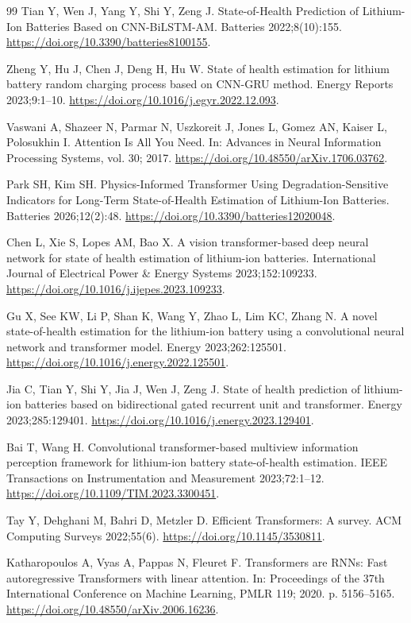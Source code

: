 \begin{thebibliography}{99}
 Tian Y, Wen J, Yang Y, Shi Y, Zeng J. State-of-Health Prediction of Lithium-Ion Batteries Based on CNN-BiLSTM-AM. Batteries 2022;8(10):155. \url{https://doi.org/10.3390/batteries8100155}.

 Zheng Y, Hu J, Chen J, Deng H, Hu W. State of health estimation for lithium battery random charging process based on CNN-GRU method. Energy Reports 2023;9:1–10. \url{https://doi.org/10.1016/j.egyr.2022.12.093}.

 Vaswani A, Shazeer N, Parmar N, Uszkoreit J, Jones L, Gomez AN, Kaiser L, Polosukhin I. Attention Is All You Need. In: Advances in Neural Information Processing Systems, vol. 30; 2017. \url{https://doi.org/10.48550/arXiv.1706.03762}.

 Park SH, Kim SH. Physics-Informed Transformer Using Degradation-Sensitive Indicators for Long-Term State-of-Health Estimation of Lithium-Ion Batteries. Batteries 2026;12(2):48. \url{https://doi.org/10.3390/batteries12020048}.

 Chen L, Xie S, Lopes AM, Bao X. A vision transformer-based deep neural network for state of health estimation of lithium-ion batteries. International Journal of Electrical Power \& Energy Systems 2023;152:109233. \url{https://doi.org/10.1016/j.ijepes.2023.109233}.

 Gu X, See KW, Li P, Shan K, Wang Y, Zhao L, Lim KC, Zhang N. A novel state-of-health estimation for the lithium-ion battery using a convolutional neural network and transformer model. Energy 2023;262:125501. \url{https://doi.org/10.1016/j.energy.2022.125501}.

 Jia C, Tian Y, Shi Y, Jia J, Wen J, Zeng J. State of health prediction of lithium-ion batteries based on bidirectional gated recurrent unit and transformer. Energy 2023;285:129401. \url{https://doi.org/10.1016/j.energy.2023.129401}.

 Bai T, Wang H. Convolutional transformer-based multiview information perception framework for lithium-ion battery state-of-health estimation. IEEE Transactions on Instrumentation and Measurement 2023;72:1–12. \url{https://doi.org/10.1109/TIM.2023.3300451}.

 Tay Y, Dehghani M, Bahri D, Metzler D. Efficient Transformers: A survey. ACM Computing Surveys 2022;55(6). \url{https://doi.org/10.1145/3530811}.

 Katharopoulos A, Vyas A, Pappas N, Fleuret F. Transformers are RNNs: Fast autoregressive Transformers with linear attention. In: Proceedings of the 37th International Conference on Machine Learning, PMLR 119; 2020. p. 5156–5165. \url{https://doi.org/10.48550/arXiv.2006.16236}.


\end{thebibliography}
